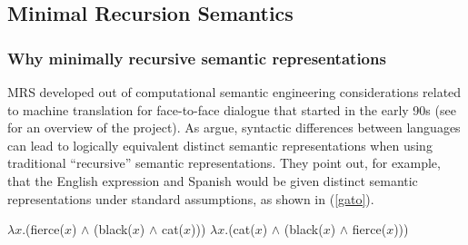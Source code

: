 \documentclass[output=paper]{langsci/langscibook}
\begin{document}
\subsection{Minimal Recursion Semantics}

\subsubsection{Why minimally recursive semantic representations}

MRS developed out of computational semantic engineering considerations related to machine translation for face-to-face dialogue that started in the early 90s (see \citealt{Kayetal1992} for an overview of the \verbmobil project). As \citet{Copestakeetal1995} argue, syntactic differences between languages can lead to logically equivalent distinct semantic representations when using traditional ``recursive'' semantic representations. They point out, for example, that the English expression  and Spanish  would be given distinct semantic representations under standard assumptions, as shown in (\ref{gato}).

\begin{exe}
\ex\label{gato}
\begin{xlist}
\ex\label{gatoa}
$\lambda x$.(fierce($x$) $\wedge$ (black($x$) $\wedge$ cat($x$)))
\ex\label{gatob}
$\lambda x$.(cat($x$) $\wedge$ (black($x$) $\wedge$ fierce($x$)))
\end{xlist}
\end{exe}
\end{document}
